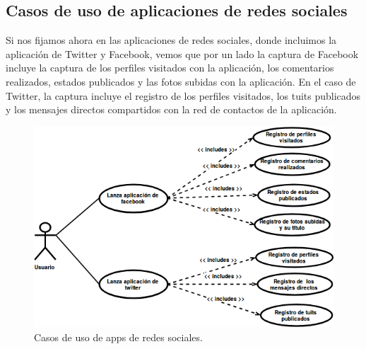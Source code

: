 \documentclass[12pt,a4paper,oneside]{book} %
\begin{document}
\subsection{Casos de uso de aplicaciones de redes sociales}
Si nos fijamos ahora en las aplicaciones de redes sociales, donde incluimos la aplicación de Twitter y Facebook, vemos que por un lado la captura de Facebook incluye la captura de los perfiles visitados con la aplicación, los comentarios realizados, estados publicados y las fotos subidas con la aplicación. 
\newline \newline 
En el caso de Twitter, la captura incluye el registro de los perfiles visitados, los tuits publicados y los mensajes directos compartidos con la red de contactos de la aplicación. 
\begin{figure}[H]
	\begin{center}
		\includegraphics[scale=0.70]{pictures/usecases/usecases05.png} %
	\end{center}
	\caption[Casos de uso de apps de redes sociales.]{Casos de uso de apps de redes sociales.}
\end{figure}
\end{document}
